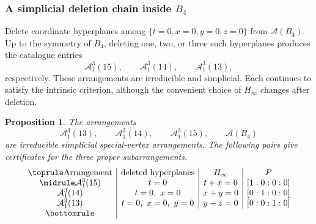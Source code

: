 \documentclass[11pt]{article}
\newtheorem{proposition}[theorem]{Proposition}
\theoremstyle{definition}
\theoremstyle{remark}
\newcommand{\cA}{\mathcal A}
\begin{document}
\subsubsection{A simplicial deletion chain inside \texorpdfstring{$B_4$}{B4}}

Delete coordinate hyperplanes among
$\{t=0,x=0,y=0,z=0\}$ from $\cA(B_4)$.  Up to the symmetry of $B_4$,
deleting one, two, or three such hyperplanes produces the catalogue entries
\[
 \cA^3_1(15),\qquad \cA^3_1(14),\qquad \cA^3_1(13),
\]
respectively.  These arrangements are irreducible and simplicial.  Each
continues to satisfy the intrinsic criterion, although the convenient
choice of $H_\infty$ changes after deletion.

\begin{proposition}\label{prop:B4-chain}
The arrangements
\[
 \cA^3_1(13),\qquad \cA^3_1(14),\qquad
 \cA^3_1(15),\qquad \cA(B_4)
\]
are irreducible simplicial special-vertex arrangements.  The following
pairs give certificates for the three proper subarrangements.
\[
\begin{array}{c|c|c|c}
\toprule
\text{Arrangement}&\text{deleted hyperplanes}&H_\infty&P\\
\midrule
\cA^3_1(15)&t=0&t+x=0&[1:0:0:0]\\
\cA^3_1(14)&t=0,\ x=0&x+y=0&[0:1:0:0]\\
\cA^3_1(13)&t=0,\ x=0,\ y=0&y+z=0&[0:0:1:0]\\
\bottomrule
\end{array}
\]
\end{proposition}
\end{document}
